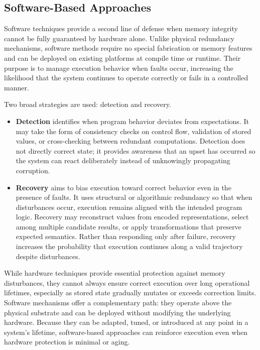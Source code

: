 \subsection{Software-Based Approaches}

Software techniques provide a second line of defense when memory integrity cannot be fully guaranteed by hardware alone. Unlike physical redundancy mechanisms, software methods require no special fabrication or memory features and can be deployed on existing platforms at compile time or runtime. Their purpose is to manage execution behavior when faults occur, increasing the likelihood that the system continues to operate correctly or fails in a controlled manner.

Two broad strategies are used: detection and recovery.

\begin{itemize}
  \item \textbf{Detection} identifies when program behavior deviates from expectations. It may take the form of consistency checks on control flow, validation of stored values, or cross-checking between redundant computations. Detection does not directly correct state; it provides awareness that an upset has occurred so the system can react deliberately instead of unknowingly propagating corruption.

  \item \textbf{Recovery} aims to bias execution toward correct behavior even in the presence of faults. It uses structural or algorithmic redundancy so that when disturbances occur, execution remains aligned with the intended program logic. Recovery may reconstruct values from encoded representations, select among multiple candidate results, or apply transformations that preserve expected semantics. Rather than responding only after failure, recovery increases the probability that execution continues along a valid trajectory despite disturbances.
\end{itemize}

While hardware techniques provide essential protection against memory disturbances, they cannot always ensure correct execution over long operational lifetimes, especially as stored state gradually mutates or exceeds correction limits. Software mechanisms offer a complementary path: they operate above the physical substrate and can be deployed without modifying the underlying hardware. Because they can be adapted, tuned, or introduced at any point in a system's lifetime, software-based approaches can reinforce execution even when hardware protection is minimal or aging.

